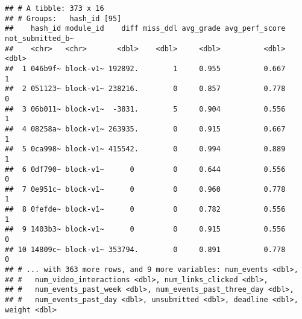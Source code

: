 \documentclass[
]{article}
\newenvironment{Shaded}{\begin{snugshade}}{\end{snugshade}}
\newcommand{\CommentTok}[1]{\textcolor[rgb]{0.56,0.35,0.01}{\textit{#1}}}
\newcommand{\DecValTok}[1]{\textcolor[rgb]{0.00,0.00,0.81}{#1}}
\newcommand{\KeywordTok}[1]{\textcolor[rgb]{0.13,0.29,0.53}{\textbf{#1}}}
\newcommand{\NormalTok}[1]{#1}
\newcommand{\OperatorTok}[1]{\textcolor[rgb]{0.81,0.36,0.00}{\textbf{#1}}}
\newcommand{\StringTok}[1]{\textcolor[rgb]{0.31,0.60,0.02}{#1}}
\begin{document}
\begin{Shaded}
\end{Shaded}

\begin{verbatim}
## # A tibble: 373 x 16
## # Groups:   hash_id [95]
##    hash_id module_id    diff miss_ddl avg_grade avg_perf_score not_submitted_b~
##    <chr>   <chr>       <dbl>    <dbl>     <dbl>          <dbl>            <dbl>
##  1 046b9f~ block-v1~ 192892.        1     0.955          0.667                1
##  2 051123~ block-v1~ 238216.        0     0.857          0.778                0
##  3 06b011~ block-v1~  -3831.        5     0.904          0.556                1
##  4 08258a~ block-v1~ 263935.        0     0.915          0.667                1
##  5 0ca998~ block-v1~ 415542.        0     0.994          0.889                1
##  6 0df790~ block-v1~      0         0     0.644          0.556                0
##  7 0e951c~ block-v1~      0         0     0.960          0.778                1
##  8 0fefde~ block-v1~      0         0     0.782          0.556                1
##  9 1403b3~ block-v1~      0         0     0.915          0.556                0
## 10 14809c~ block-v1~ 353794.        0     0.891          0.778                0
## # ... with 363 more rows, and 9 more variables: num_events <dbl>,
## #   num_video_interactions <dbl>, num_links_clicked <dbl>,
## #   num_events_past_week <dbl>, num_events_past_three_day <dbl>,
## #   num_events_past_day <dbl>, unsubmitted <dbl>, deadline <dbl>, weight <dbl>
\end{verbatim}
\end{document}
